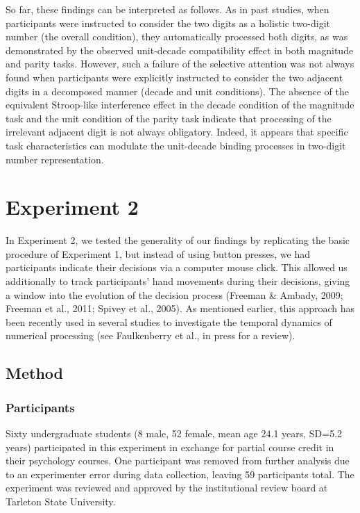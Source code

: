 \documentclass[english,man]{apa6}
\theoremstyle{definition}
\theoremstyle{definition}
\theoremstyle{definition}
\theoremstyle{remark}
\begin{document}
So far, these findings can be interpreted as follows. As in past
studies, when participants were instructed to consider the two digits as
a holistic two-digit number (the overall condition), they automatically
processed both digits, as was demonstrated by the observed unit-decade
compatibility effect in both magnitude and parity tasks. However, such a
failure of the selective attention was not always found when
participants were explicitly instructed to consider the two adjacent
digits in a decomposed manner (decade and unit conditions). The absence
of the equivalent Stroop-like interference effect in the decade
condition of the magnitude task and the unit condition of the parity
task indicate that processing of the irrelevant adjacent digit is not
always obligatory. Indeed, it appears that specific task characteristics
can modulate the unit-decade binding processes in two-digit number
representation.

\section{Experiment 2}\label{experiment-2}

In Experiment 2, we tested the generality of our findings by replicating
the basic procedure of Experiment 1, but instead of using button
presses, we had participants indicate their decisions via a computer
mouse click. This allowed us additionally to track participants' hand
movements during their decisions, giving a window into the evolution of
the decision process (Freeman \& Ambady, 2009; Freeman et al., 2011;
Spivey et al., 2005). As mentioned earlier, this approach has been
recently used in several studies to investigate the temporal dynamics of
numerical processing (see Faulkenberry et al., in press for a review).

\subsection{Method}\label{method-1}

\subsubsection{Participants}\label{participants-1}

Sixty undergraduate students (8 male, 52 female, mean age 24.1 years,
SD=5.2 years) participated in this experiment in exchange for partial
course credit in their psychology courses. One participant was removed
from further analysis due to an experimenter error during data
collection, leaving 59 participants total. The experiment was reviewed
and approved by the institutional review board at Tarleton State
University.
\end{document}
